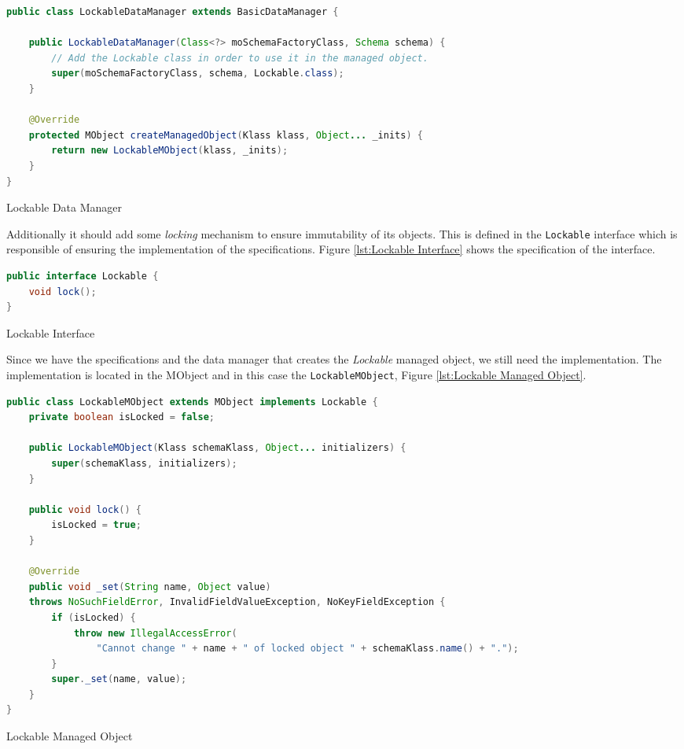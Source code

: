 \begin{sourcecode} [H]
	\begin{lstlisting}[language=Java, escapechar=|]
public class LockableDataManager extends BasicDataManager {

	public LockableDataManager(Class<?> moSchemaFactoryClass, Schema schema) {
		// Add the Lockable class in order to use it in the managed object.
		super(moSchemaFactoryClass, schema, Lockable.class);
	}

	@Override
	protected MObject createManagedObject(Klass klass, Object... _inits) {
		return new LockableMObject(klass, _inits);
	}
}
	\end{lstlisting}
	\caption{Lockable Data Manager}
	\label{lst:Lockable Data Manager}
\end{sourcecode}

Additionally it should add some \textit{locking} mechanism to ensure immutability of its objects.
This is defined in the \texttt{Lockable} interface which is responsible of ensuring the implementation of the specifications. Figure \ref{lst:Lockable Interface} shows the specification of the interface.

\begin{sourcecode} [H]
	\begin{lstlisting}[language=Java, escapechar=|]
public interface Lockable {
	void lock();
}
	\end{lstlisting}
	\caption{Lockable Interface}
	\label{lst:Lockable Interface}
\end{sourcecode}

Since we have the specifications and the data manager that creates the \textit{Lockable} managed object, we still need the implementation.
The implementation is located in the MObject and in this case the \texttt{LockableMObject}, Figure \ref{lst:Lockable Managed Object}.

\begin{sourcecode} [H]
	\begin{lstlisting}[language=Java, escapechar=|]
public class LockableMObject extends MObject implements Lockable {
	private boolean isLocked = false;

	public LockableMObject(Klass schemaKlass, Object... initializers) {
		super(schemaKlass, initializers);
	}

	public void lock() {
		isLocked = true;
	}

	@Override
	public void _set(String name, Object value) 
	throws NoSuchFieldError, InvalidFieldValueException, NoKeyFieldException {
		if (isLocked) {
	    	throw new IllegalAccessError(
	    		"Cannot change " + name + " of locked object " + schemaKlass.name() + ".");
		}
		super._set(name, value);
	}
}
	\end{lstlisting}
	\caption{Lockable Managed Object}
	\label{lst:Lockable Managed Object}
\end{sourcecode}

